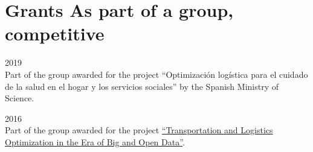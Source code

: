 \section*{Grants \small{As part of a group, competitive}}

\begin{paracol}{2}
  2019
\switchcolumn
  \\
  Part of the group awarded for the project ``Optimización logística para el cuidado de la salud en el hogar y los servicios sociales'' by the Spanish Ministry of Science.
\end{paracol}

\begin{paracol}{2}
  2016
\switchcolumn
  \\
  Part of the group awarded for the project \href{https://santini.in/files/cv/prin16.pdf}{``Transportation and Logistics Optimization in the Era of Big and Open Data''}.
\end{paracol}